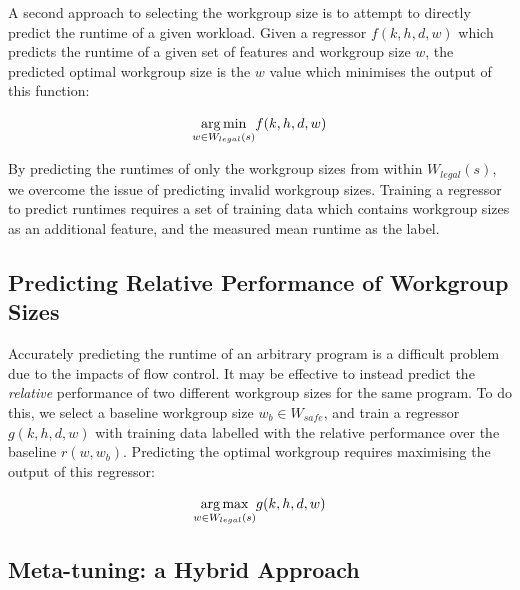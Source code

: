 A second approach to selecting the workgroup size is to attempt to
directly predict the runtime of a given workload. Given a regressor
$f(k,h,d,w)$ which predicts the runtime of a given set of features and
workgroup size $w$, the predicted optimal workgroup size is the $w$
value which minimises the output of this function:

\begin{equation}
  \underset{w \in W_{legal}(s)}{\operatorname*{arg\,min}} f(k,h,d,w)
\end{equation}

By predicting the runtimes of only the workgroup sizes from within
$W_{legal}(s)$, we overcome the issue of predicting invalid workgroup
sizes. Training a regressor to predict runtimes requires a set of
training data which contains workgroup sizes as an additional feature,
and the measured mean runtime as the label.

% 

\subsection{Predicting Relative Performance of Workgroup Sizes}

Accurately predicting the runtime of an arbitrary program is a
difficult problem due to the impacts of flow control. It may be
effective to instead predict the \emph{relative} performance of two
different workgroup sizes for the same program. To do this, we select
a baseline workgroup size $w_b \in W_{safe}$, and train a regressor
$g(k,h,d,w)$ with training data labelled with the relative performance
over the baseline $r(w, w_b)$. Predicting the optimal workgroup
requires maximising the output of this regressor:

\begin{equation}
  \underset{w \in W_{legal}(s)}{\operatorname*{arg\,max}} g(k,h,d,w)
\end{equation}

% 


\subsection{Meta-tuning: a Hybrid Approach}

